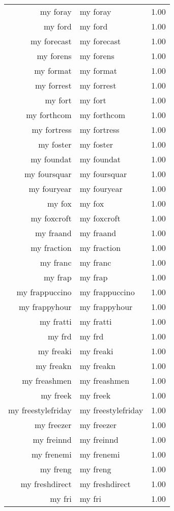 \begin{table}[ht]
\begin{tabular}{rlr}
  my foray & my foray & 1.00 \\ 
  my ford & my ford & 1.00 \\ 
  my forecast & my forecast & 1.00 \\ 
  my forens & my forens & 1.00 \\ 
  my format & my format & 1.00 \\ 
  my forrest & my forrest & 1.00 \\ 
  my fort & my fort & 1.00 \\ 
  my forthcom & my forthcom & 1.00 \\ 
  my fortress & my fortress & 1.00 \\ 
  my foster & my foster & 1.00 \\ 
  my foundat & my foundat & 1.00 \\ 
  my foursquar & my foursquar & 1.00 \\ 
  my fouryear & my fouryear & 1.00 \\ 
  my fox & my fox & 1.00 \\ 
  my foxcroft & my foxcroft & 1.00 \\ 
  my fraand & my fraand & 1.00 \\ 
  my fraction & my fraction & 1.00 \\ 
  my franc & my franc & 1.00 \\ 
  my frap & my frap & 1.00 \\ 
  my frappuccino & my frappuccino & 1.00 \\ 
  my frappyhour & my frappyhour & 1.00 \\ 
  my fratti & my fratti & 1.00 \\ 
  my frd & my frd & 1.00 \\ 
  my freaki & my freaki & 1.00 \\ 
  my freakn & my freakn & 1.00 \\ 
  my freashmen & my freashmen & 1.00 \\ 
  my freek & my freek & 1.00 \\ 
  my freestylefriday & my freestylefriday & 1.00 \\ 
  my freezer & my freezer & 1.00 \\ 
  my freinnd & my freinnd & 1.00 \\ 
  my frenemi & my frenemi & 1.00 \\ 
  my freng & my freng & 1.00 \\ 
  my freshdirect & my freshdirect & 1.00 \\ 
  my fri & my fri & 1.00 \\ 

\end{tabular}
\end{table}
